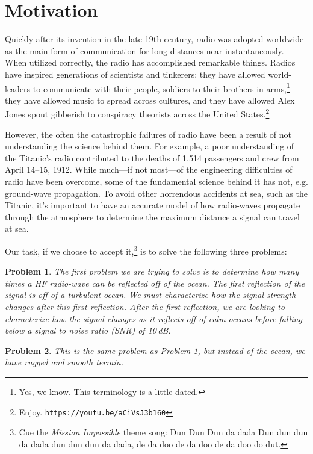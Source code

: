 \documentclass[11pt]{article}
\newtheorem{problem}{Problem}
\numberwithin{equation}{section}
\begin{document}
\section{Motivation} %
\label{sec:motivation}

Quickly after its invention in the late 19th century, radio was adopted worldwide as the main form of communication for long distances near instantaneously.\cite{hilmes2002radio} When utilized correctly, the radio has accomplished remarkable things. Radios have inspired generations of scientists and tinkerers; they have allowed world-leaders to communicate with their people, soldiers to their brothers-in-arms,\footnote{Yes, we know. This terminology is a little dated.} they have allowed music to spread across cultures, and they have allowed Alex Jones spout gibberish to conspiracy theorists across the United States.\footnote{Enjoy. \texttt{https://youtu.be/aCiVsJ3b160}} 

However, the often the catastrophic failures of radio have been a result of not understanding the science behind them. For example, a poor understanding of the Titanic's radio contributed to the deaths of 1,514 passengers and crew from April 14--15, 1912.\cite{noauthor_radio_2011} While much---if not most---of the engineering difficulties of radio have been overcome, some of the fundamental science behind it has not, e.g. ground-wave propagation.\cite{budden1961radio} To avoid other horrendous accidents at sea, such as the Titanic, it's important to have an accurate model of how radio-waves propagate through the atmosphere to determine the maximum distance a signal can travel at sea.

Our task, if we choose to accept it,\footnote{Cue the \emph{Mission Impossible} theme song: Dun Dun Dun da dada Dun dun dun da dada dun dun dun da dada, de da doo de da doo de da doo do dut.} is to solve the following three problems:
\begin{problem}
 The first problem we are trying to solve is to determine how many times a HF radio-wave can be reflected off of the ocean. The first reflection of the signal is off of a turbulent ocean. We must characterize how the signal strength changes after this first reflection. After the first reflection, we are looking to characterize how the signal changes as it reflects off of calm oceans before falling below a signal to noise ratio (SNR) of 10\,\si{\dB}.
 \label{pr:turb_ocean}
\end{problem}

\begin{problem}
    This is the same problem as Problem \ref{pr:turb_ocean}, but instead of the ocean, we have rugged and smooth terrain.
    \label{pr:mount}
\end{problem}
\end{document}
